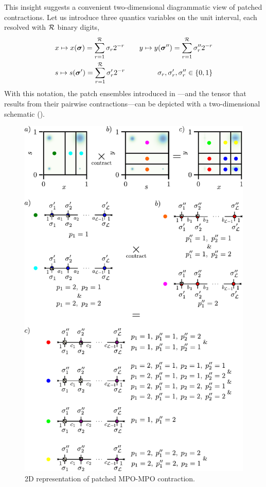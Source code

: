 This insight suggests a convenient two-dimensional diagrammatic view of patched contractions. Let us introduce three quantics variables on the unit interval, each resolved with $\mathcal{R}$ binary digits,
\begin{equation}
    \begin{aligned}
        &x \mapsto x(\boldsymbol{\sigma}) = \sum_{r=1}^{\mathcal{R}} \sigma_r 2^{-r} \quad &y \mapsto y(\boldsymbol{\sigma}'') = \sum_{r=1}^{\mathcal{R}} \sigma''_r 2^{-r}\\ 
        &s \mapsto s(\boldsymbol{\sigma}') = \sum_{r=1}^{\mathcal{R}} \sigma'_r 2^{-r} \quad &\sigma_r,\sigma'_r,\sigma''_r \in \{0,1\}
    \end{aligned}
\end{equation}
With this notation, the patch ensembles introduced in —and the tensor that results from their pairwise contractions—can be depicted with a two-dimensional schematic ().

\begin{figure}[ht!]
    \centering
    \includegraphics{figures/2DPatchContrRepr.pdf}
    \caption{2D representation of patched MPO-MPO contraction.}
    \label{fig:2DPatchContrRepr}
\end{figure}

